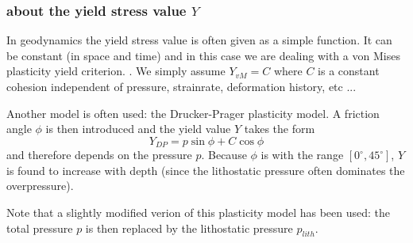\subsubsection{about the yield stress value $Y$}

In geodynamics the yield stress value is often given as a simple function. 
It can be constant (in space and time) and in this case we are dealing with a von Mises plasticity yield criterion. 
. We simply assume $Y_{vM}=C$ where $C$ is a constant cohesion independent of pressure, strainrate,
deformation history, etc ... 

Another model is often used: the Drucker-Prager plasticity model. 
A friction angle $\phi$ is then introduced and the yield value $Y$ takes the form
\[
Y_{DP}=p \sin\phi + C \cos \phi
\]
and therefore depends on the pressure $p$. Because $\phi$ is with the range $[0^\circ,45^\circ]$, $Y$ is
found to increase with depth (since the lithostatic pressure often dominates the overpressure).

Note that a slightly modified verion of this plasticity model has been used: the total pressure $p$
is then replaced by the lithostatic pressure $p_{lith}$.







